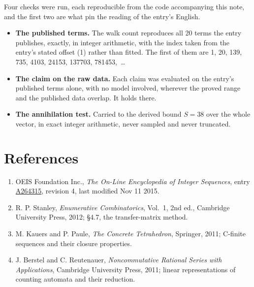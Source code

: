 \documentclass[11pt]{article}
\theoremstyle{definition}
\begin{document}
Four checks were run, each reproducible from the code accompanying this note, and the first two are what pin the reading of the entry's English.

\begin{itemize}

\item {\bfseries The published terms.} The walk count reproduces all 20 terms the entry publishes, exactly, in integer arithmetic, with the index taken from the entry's stated offset (1) rather than fitted. The first of them are 1, 20, 139, 735, 4103, 24153, 137703, 781453,~\dots

\item {\bfseries The claim on the raw data.} Each claim was evaluated on the entry's published terms alone, with no model involved, wherever the proved range and the published data overlap. It holds there.

\item {\bfseries The annihilation test.} Carried to the derived bound $S = 38$ over the whole vector, in exact integer arithmetic, never sampled and never truncated.

\end{itemize}

\section{References}

\begin{enumerate}

\item OEIS Foundation Inc., \emph{The On-Line Encyclopedia of Integer Sequences}, entry \href{https://oeis.org/A264315}{A264315}, revision 4, last modified Nov 11 2015.

\item R. P. Stanley, \emph{Enumerative Combinatorics}, Vol.~1, 2nd ed., Cambridge University Press, 2012; \S4.7, the transfer-matrix method.

\item M. Kauers and P. Paule, \emph{The Concrete Tetrahedron}, Springer, 2011; C-finite sequences and their closure properties.

\item J. Berstel and C. Reutenauer, \emph{Noncommutative Rational Series with Applications}, Cambridge University Press, 2011; linear representations of counting automata and their reduction.

\end{enumerate}
\end{document}
